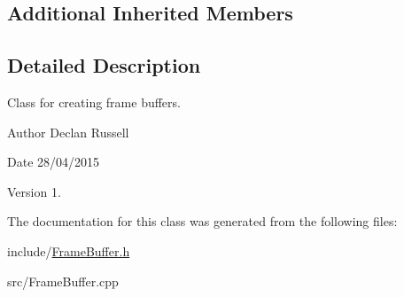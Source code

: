 \subsection*{Additional Inherited Members}


\subsection{Detailed Description}
Class for creating frame buffers. 

\begin{DoxyAuthor}{Author}
Declan Russell 
\end{DoxyAuthor}
\begin{DoxyDate}{Date}
28/04/2015 
\end{DoxyDate}
\begin{DoxyVersion}{Version}
1. 
\end{DoxyVersion}


The documentation for this class was generated from the following files\-:\begin{DoxyCompactItemize}
\item 
include/\hyperlink{_frame_buffer_8h}{Frame\-Buffer.\-h}\item 
src/Frame\-Buffer.\-cpp\end{DoxyCompactItemize}
